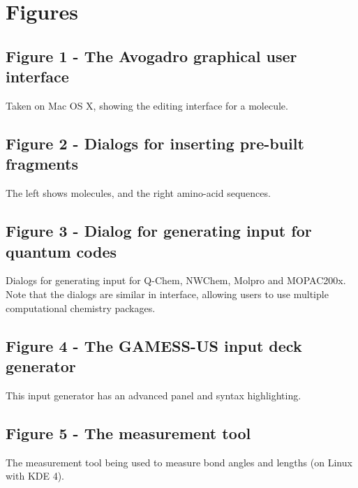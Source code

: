 \documentclass[10pt]{bmc_article}
\newenvironment{bmcformat}{\begin{raggedright}
  \baselineskip20pt\sloppy\setboolean{publ}{false}}{\end{raggedright}
  \baselineskip20pt\sloppy}
\begin{document}
\begin{bmcformat}
\newpage
{
   }     %





\section*{Figures}
  \subsection*{Figure 1 - The Avogadro graphical user interface}
    Taken on Mac OS X, showing the editing interface for a molecule.

  \subsection*{Figure 2 - Dialogs for inserting pre-built fragments}
    The left shows molecules, and the right amino-acid sequences.

  \subsection*{Figure 3 - Dialog for generating input for quantum codes}
    Dialogs for generating input for Q-Chem, NWChem, Molpro and MOPAC200x.
    Note that the dialogs are similar in interface, allowing users to use
    multiple computational chemistry packages.

  \subsection*{Figure 4 - The GAMESS-US input deck generator}
    This input generator has an advanced panel and syntax highlighting.

  \subsection*{Figure 5 - The measurement tool}
    The measurement tool being used to measure bond angles and lengths
    (on Linux with KDE 4).


\end{bmcformat}
\end{document}
